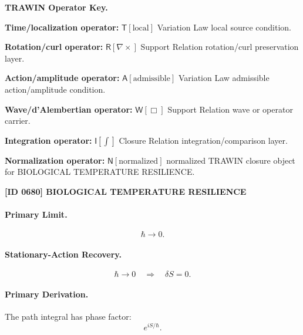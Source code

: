 \par\vspace{0.45\baselineskip}
\noindent\begin{minipage}[t]{\linewidth}
\begingroup
\small
\raggedright
\textbf{TRAWIN Operator Key.}\par
\noindent\textbf{Time/localization operator:} $\mathsf{T}\!\left[\mathrm{local}\right]$ Variation Law local source condition.\par
\noindent\textbf{Rotation/curl operator:} $\mathsf{R}\!\left[\nabla\times\right]$ Support Relation rotation/curl preservation layer.\par
\noindent\textbf{Action/amplitude operator:} $\mathsf{A}\!\left[\mathrm{admissible}\right]$ Variation Law admissible action/amplitude condition.\par
\noindent\textbf{Wave/d'Alembertian operator:} $\mathsf{W}\!\left[\Box\right]$ Support Relation wave or operator carrier.\par
\noindent\textbf{Integration operator:} $\mathsf{I}\!\left[\int\right]$ Closure Relation integration/comparison layer.\par
\noindent\textbf{Normalization operator:} $\mathsf{N}\!\left[\mathrm{normalized}\right]$ normalized TRAWIN closure object for BIOLOGICAL TEMPERATURE RESILIENCE.\par
\endgroup
\end{minipage}

\clearpage
\noindent\textbf{[ID 0680] BIOLOGICAL TEMPERATURE RESILIENCE}\par
\vspace{0.35em}
\paragraph{Primary Limit.}
\begin{equation}
\hbar\rightarrow 0 .
\end{equation}

\paragraph{Stationary-Action Recovery.}
\begin{equation}
\hbar\rightarrow 0
\quad\Longrightarrow\quad
\delta S=0 .
\end{equation}

\paragraph{Primary Derivation.}
The path integral has phase factor:
\begin{equation}
e^{iS/\hbar}.
\end{equation}

